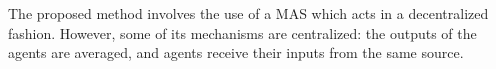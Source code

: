 \documentclass{ieeeaccess}
\begin{document}



The proposed method involves the use of a MAS which acts in a
decentralized fashion. However, some of its mechanisms are
centralized: the outputs of the agents are averaged, and agents
receive their inputs from the same source.

\end{document}

